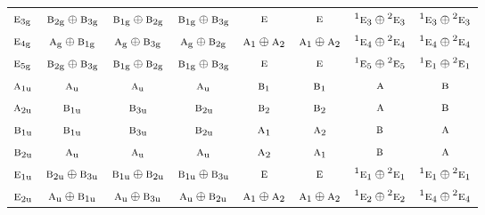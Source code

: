 \documentclass[10pt,a4paper]{article}
\numberwithin{equation}{section}
\newcommand{\irr}[1]{\text{\normalfont\scshape #1}}
\newcommand{\conjpair}[1]{{}^{#1}}
\newcommand{\ptag}[1]{\mathrm{#1}}
\begin{document}
{\begin{longtable}{@{}lccccccc@{}}
$\irr{e}_{3\ptag{g}}$ & $\irr{b}_{2\ptag{g}}\oplus \irr{b}_{3\ptag{g}}$ & $\irr{b}_{1\ptag{g}}\oplus \irr{b}_{2\ptag{g}}$ & $\irr{b}_{1\ptag{g}}\oplus \irr{b}_{3\ptag{g}}$ & $\irr{e}$ & $\irr{e}$ & $\conjpair{1}\irr{e}_{3}\oplus \conjpair{2}\irr{e}_{3}$ & $\conjpair{1}\irr{e}_{3}\oplus \conjpair{2}\irr{e}_{3}$\\
$\irr{e}_{4\ptag{g}}$ & $\irr{a}_{\ptag{g}}\oplus \irr{b}_{1\ptag{g}}$ & $\irr{a}_{\ptag{g}}\oplus \irr{b}_{3\ptag{g}}$ & $\irr{a}_{\ptag{g}}\oplus \irr{b}_{2\ptag{g}}$ & $\irr{a}_{1}\oplus \irr{a}_{2}$ & $\irr{a}_{1}\oplus \irr{a}_{2}$ & $\conjpair{1}\irr{e}_{4}\oplus \conjpair{2}\irr{e}_{4}$ & $\conjpair{1}\irr{e}_{4}\oplus \conjpair{2}\irr{e}_{4}$\\
$\irr{e}_{5\ptag{g}}$ & $\irr{b}_{2\ptag{g}}\oplus \irr{b}_{3\ptag{g}}$ & $\irr{b}_{1\ptag{g}}\oplus \irr{b}_{2\ptag{g}}$ & $\irr{b}_{1\ptag{g}}\oplus \irr{b}_{3\ptag{g}}$ & $\irr{e}$ & $\irr{e}$ & $\conjpair{1}\irr{e}_{5}\oplus \conjpair{2}\irr{e}_{5}$ & $\conjpair{1}\irr{e}_{1}\oplus \conjpair{2}\irr{e}_{1}$\\
$\irr{a}_{1\ptag{u}}$ & $\irr{a}_{\ptag{u}}$ & $\irr{a}_{\ptag{u}}$ & $\irr{a}_{\ptag{u}}$ & $\irr{b}_{1}$ & $\irr{b}_{1}$ & $\irr{a}$ & $\irr{b}$\\
$\irr{a}_{2\ptag{u}}$ & $\irr{b}_{1\ptag{u}}$ & $\irr{b}_{3\ptag{u}}$ & $\irr{b}_{2\ptag{u}}$ & $\irr{b}_{2}$ & $\irr{b}_{2}$ & $\irr{a}$ & $\irr{b}$\\
$\irr{b}_{1\ptag{u}}$ & $\irr{b}_{1\ptag{u}}$ & $\irr{b}_{3\ptag{u}}$ & $\irr{b}_{2\ptag{u}}$ & $\irr{a}_{1}$ & $\irr{a}_{2}$ & $\irr{b}$ & $\irr{a}$\\
$\irr{b}_{2\ptag{u}}$ & $\irr{a}_{\ptag{u}}$ & $\irr{a}_{\ptag{u}}$ & $\irr{a}_{\ptag{u}}$ & $\irr{a}_{2}$ & $\irr{a}_{1}$ & $\irr{b}$ & $\irr{a}$\\
$\irr{e}_{1\ptag{u}}$ & $\irr{b}_{2\ptag{u}}\oplus \irr{b}_{3\ptag{u}}$ & $\irr{b}_{1\ptag{u}}\oplus \irr{b}_{2\ptag{u}}$ & $\irr{b}_{1\ptag{u}}\oplus \irr{b}_{3\ptag{u}}$ & $\irr{e}$ & $\irr{e}$ & $\conjpair{1}\irr{e}_{1}\oplus \conjpair{2}\irr{e}_{1}$ & $\conjpair{1}\irr{e}_{1}\oplus \conjpair{2}\irr{e}_{1}$\\
$\irr{e}_{2\ptag{u}}$ & $\irr{a}_{\ptag{u}}\oplus \irr{b}_{1\ptag{u}}$ & $\irr{a}_{\ptag{u}}\oplus \irr{b}_{3\ptag{u}}$ & $\irr{a}_{\ptag{u}}\oplus \irr{b}_{2\ptag{u}}$ & $\irr{a}_{1}\oplus \irr{a}_{2}$ & $\irr{a}_{1}\oplus \irr{a}_{2}$ & $\conjpair{1}\irr{e}_{2}\oplus \conjpair{2}\irr{e}_{2}$ & $\conjpair{1}\irr{e}_{4}\oplus \conjpair{2}\irr{e}_{4}$\\

\end{longtable}}
\end{document}
